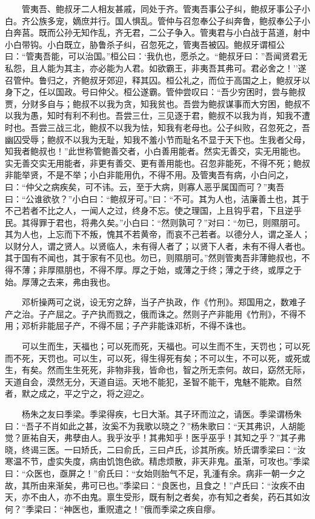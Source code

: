 　　管夷吾、鲍叔牙二人相友甚戚，同处于齐。管夷吾事公子纠，鲍叔牙事公子小白。齐公族多宠，嫡庶并行。国人惧乱。管仲与召忽奉公子纠奔鲁，鲍叔奉公子小白奔莒。既而公孙无知作乱，齐无君，二公子争入。管夷君与小白战于莒道，射中小白带钩。小白既立，胁鲁杀子纠，召忽死之，管夷吾被囚。鲍叔牙谓桓公曰：``管夷吾能，可以治国。''桓公曰：`我仇也，愿杀之。``鲍叔牙曰：''吾闻贤君无私怨，且人能为其主，亦必能为人君。如欲霸王，非夷吾其弗可。君必舍之！''遂召管仲。鲁归之，齐鲍叔牙郊迎，释其囚。桓公礼之，而位于高国之上，鲍叔牙以身下之，任以国政。号曰仲父。桓公遂霸。管仲尝叹曰：``吾少穷困时，尝与鲍叔贾，分财多自与；鲍叔不以我为贪，知我贫也。吾尝为鲍叔谋事而大穷困，鲍叔不以我为愚，知时有利不利也。吾尝三仕，三见逐于君，鲍叔不以我为肖，知我不遭时也。吾尝三战三北，鲍叔不以我为怯，知我有老母也。公子纠败，召忽死之，吾幽囚受辱；鲍叔不以我为无耻，知我不羞小节而耻名不显于天下也。生我者父母，知我者鲍叔也！''此世称管鲍善交者，小白善用能者。然实无善交，实无用能也。实无善交实无用能者，非更有善交、更有善用能也。召忽非能死，不得不死；鲍叔非能举贤，不是不举；小白非能用仇，不得不用。及管夷吾有病，小白问之，曰：``仲父之病疾矣，可不讳。云，至于大病，则寡人恶乎属国而可？''夷吾曰：``公谁欲欤？''小白曰：``鲍叔牙可。''曰：``不可。其为人也，洁廉善土也，其于不己若者不比之人，一闻人之过，终身不忘。使之理国，上且钩乎君，下且逆乎民。其得罪于君也，将弗久矣。''小白曰：``然则孰可？''对曰：``勿已，则隰朋可。其为人也，上忘而下不叛，愧其不若黄帝，而哀不己若者。以德分人，谓之圣人；以财分人，谓之贤人。以贤临人，未有得人者了；以贤下人者，未有不得人者也。其于国有不闻也，其于家有不见也。勿已，则隰朋可。''然则管夷吾非薄鲍叔也，不得不薄；非厚隰朋也，不得不厚。厚之于始，或薄之于终；薄之于终，或厚之于始。厚薄之去来，弗由我也。

　　邓析操两可之说，设无穷之辞，当子产执政，作《竹刑》。郑国用之，数难子产之治。子产屈之。子产执而戮之，俄而诛之。然则子产非能用《竹刑》，不得不用；邓析非能屈子产，不得不屈；子产非能诛邓析，不得不诛也。

　　可以生而生，天福也；可以死而死，天福也。可以生而不生，天罚也；可以死而不死，天罚也。可以生，可以死，得生得死有矣；不可以生，不可以死，或死或生，有矣。然而生生死死，非物非我，皆命也，智之所无柰何。故曰，窈然无际，天道自会，漠然无分，天道自运。天地不能犯，圣智不能干，鬼魅不能欺。自然者，默之成之，平之宁之，将之迎之。

　　杨朱之友曰季梁。季梁得疾，七日大渐。其子环而泣之，请医。季梁谓杨朱曰：``吾子不肖如此之甚，汝奚不为我歌以晓之？''杨朱歌曰：``天其弗识，人胡能觉？匪祐自天，弗孽由人。我乎汝乎！其弗知乎！医乎巫乎！其知之乎？''其子弗晓，终谒三医。一曰矫氏，二曰俞氏，三曰卢氏，诊其所疾。矫氏谓季梁曰：``汝寒温不节，虚实失度，病由饥饱色欲。精虑烦散，非天非鬼。虽渐，可攻也。''季梁曰：``众医也，亟屏之！''俞氏曰：``女始则胎气不足，乳湩有余。病非一朝一夕之故，其所由来渐矣，弗可已也。''季梁曰：``良医也，且食之！''卢氏曰：``汝疾不由天，亦不由人，亦不由鬼。禀生受形，既有制之者矣，亦有知之者矣，药石其如汝何？''季梁曰：``神医也，重贶遣之！''俄而季梁之疾自瘳。

